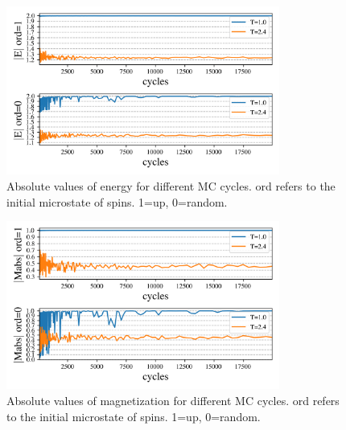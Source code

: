 \begin{figure}[H]
  \centering
  \includegraphics[width=0.8\textwidth]{../figures/equilibrium_E.png}
  \caption{Absolute values of energy for different MC cycles.
  ord refers to the initial microstate of spins. 1=up, 0=random.}
  \label{fig:equi_E}
\end{figure}


\begin{figure}[H]
  \centering
  \includegraphics[width=0.8\textwidth]{../figures/equilibrium_Mabs.png}
  \caption{Absolute values of magnetization for different MC cycles.
  ord refers to the initial microstate of spins. 1=up, 0=random.}
  \label{fig:equi_M}
\end{figure}




